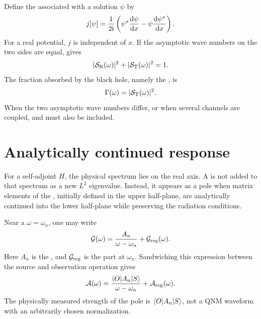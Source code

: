 Define the  associated with a solution $\psi$ by
\begin{equation}
j[\psi]
=
\frac{1}{2\mathrm{i}}
\left(
\psi^*\frac{\mathrm{d}\psi}{\mathrm{d} x}
-
\psi\frac{\mathrm{d}\psi^*}{\mathrm{d} x}
\right).
\label{eq:conserved_flux}
\end{equation}
For a real potential, $j$ is independent of $x$. If the asymptotic wave numbers on the two sides are equal,  gives
\begin{equation}
|\mathcal{S}_{\mathrm{R}}(\omega)|^2
+
|\mathcal{S}_{\mathrm{T}}(\omega)|^2
=
1.
\label{eq:unitarity_one_channel}
\end{equation}
The fraction absorbed by the black hole, namely the , is
\begin{equation}
\Gamma(\omega)
=
|\mathcal{S}_{\mathrm{T}}(\omega)|^2.
\label{eq:greybody_factor}
\end{equation}
When the two asymptotic wave numbers differ, or when several channels are coupled,  and  must also be included.

\section{Analytically continued response}

For a self-adjoint $H$, the physical spectrum lies on the real axis. A  is not added to that spectrum as a new $L^2$ eigenvalue. Instead, it appears as a pole when matrix elements of the , initially defined in the upper half-plane, are analytically continued into the lower half-plane while preserving the radiation conditions.

Near a  $\omega=\omega_n$, one may write
\begin{equation}
\mathcal{G}(\omega)
=
\frac{A_n}{\omega-\omega_n}
+\mathcal{G}_{\mathrm{reg}}(\omega).
\label{eq:green_simple_pole}
\end{equation}
Here $A_n$ is the , and $\mathcal{G}_{\mathrm{reg}}$ is the part  at $\omega_n$. Sandwiching this expression between the source and observation operation gives
\begin{equation}
\mathcal{A}(\omega)
=
\frac{
\langle O \rvert A_n\lvert S \rangle
}{
\omega-\omega_n
}
+\mathcal{A}_{\mathrm{reg}}(\omega).
\label{eq:amplitude_simple_pole}
\end{equation}
The physically measured strength of the pole is $\langle O \rvert A_n\lvert S \rangle$, not a QNM waveform with an arbitrarily chosen normalization.

